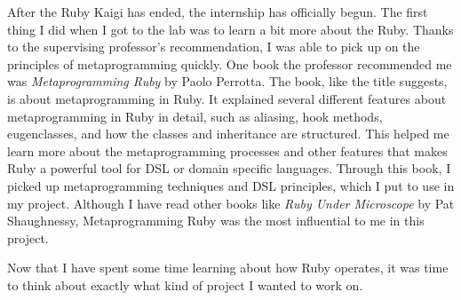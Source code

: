 After the Ruby Kaigi has ended, the internship has officially begun.  The first thing I did when I got to the lab was to learn a bit more about the Ruby.  Thanks to the supervising professor's recommendation, I was able to pick up on the principles of metaprogramming quickly.  One book the professor recommended me was \textit{Metaprogramming Ruby} by Paolo Perrotta.  The book, like the title suggests, is about metaprogramming in Ruby.  It explained several different features about metaprogramming in Ruby in detail, such as aliasing, hook methods, eugenclasses, and how the classes and inheritance are structured.  This helped me learn more about the metaprogramming processes and other features that makes Ruby a powerful tool for DSL or domain specific languages.  Through this book, I picked up metaprogramming techniques and DSL principles, which I put to use in my project.  Although I have read other books like \textit{Ruby Under Microscope} by Pat Shaughnessy, Metaprogramming Ruby was the most influential to me in this project.

Now that I have spent some time learning about how Ruby operates, it was time to think about exactly what kind of project I wanted to work on.
